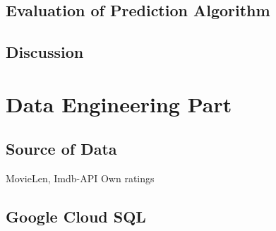 \documentclass{article}
\begin{document}
\subsection{Evaluation of Prediction Algorithm}


\subsection{Discussion}


\section{Data Engineering Part}

\subsection{Source of Data}

MovieLen, Imdb-API
Own ratings


\subsection{Google Cloud SQL}
\end{document}
